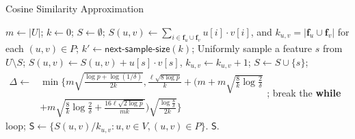 \documentclass[sigconf,anonymous]{acmart}
\begin{document}
\begin{algorithm}[!t]
\caption{\textsf{Cosine Similarity Approximation}}
\label{alg:csa}
\renewcommand{\algorithmicrequire}{\textbf{Input:}}
\renewcommand{\algorithmicensure}{\textbf{Output:}}
\begin{algorithmic}
\State $m \gets |U|$; $k \gets 0$; $S \gets \emptyset$;
\State $S(u,v) \gets \sum_{i\in \mathbf{f}_u \cup \mathbf{f}_v} u[i] \cdot v[i]$, and $k_{u,v} = |\mathbf{f}_u \cup \mathbf{f}_v|$ for each $(u, v) \in P$;
	\State $k' \gets \textsf{next-sample-size}(k)$;
		\State Uniformly sample a feature $s$ from $U\setminus S$;
				\State $S(u,v) \gets S(u,v)+u[s]\cdot v[s]$, $k_{u,v} \gets k_{u,v}+1$;
			\EndIf
		\EndFor
		\State $S \gets S\cup \{s\}$;
	\EndFor
	\State $\begin{aligned}\Delta \gets &\min\bigg\{m\sqrt{\frac{\log p + \log(1/\delta)}{2k}}, \frac{\ell\sqrt{8\log p}}{k} +\bigg(m+m\sqrt{\frac{8}{k}\log \frac{2}{\delta}} \\&+ m\sqrt{\frac{8}{k}\log \frac{2}{\delta} + \frac{16\ell\sqrt{2\log p}}{mk}}\bigg)\sqrt{\frac{\log \frac{8}{\delta}}{2k}}\bigg\}\end{aligned}$;
	\If {$\Delta \leq \epsilon$}
		\State break the {\bf while} loop;
	\EndIf
\EndWhile
\State $\mathsf{S} \gets \{S(u,v)/k_{u,v} : u,v\in V, (u,v)\in P\}$.
 $\mathsf{S}$.
\end{algorithmic}
\end{algorithm}
\end{document}
